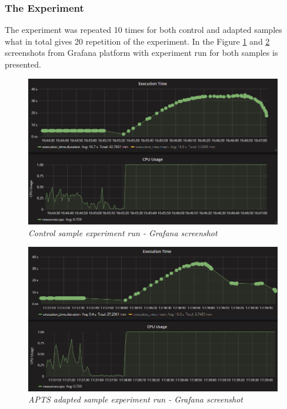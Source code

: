 \documentclass[12pt,a4paper]{article}
\begin{document}
\subsubsection{The Experiment} 

The experiment was repeated 10 times for both control and adapted samples what in total gives 20 repetition of the experiment. In the Figure \ref{figure:threads:screen:control} and \ref{figure:threads:screen:adapted} screenshots from Grafana platform with experiment run for both samples is presented.

\begin{figure}[!htb]
\centering
\includegraphics[width=1\textwidth]{threadsCtrl}
\caption{\textit{Control sample experiment run - Grafana screenshot}} \label{figure:threads:screen:control}
\end{figure}
\begin{figure}[!htb]
\centering
\includegraphics[width=1\textwidth]{threadsEval}
\caption{\textit{APTS adapted sample experiment run - Grafana screenshot}} \label{figure:threads:screen:adapted}
\end{figure}
\end{document}
